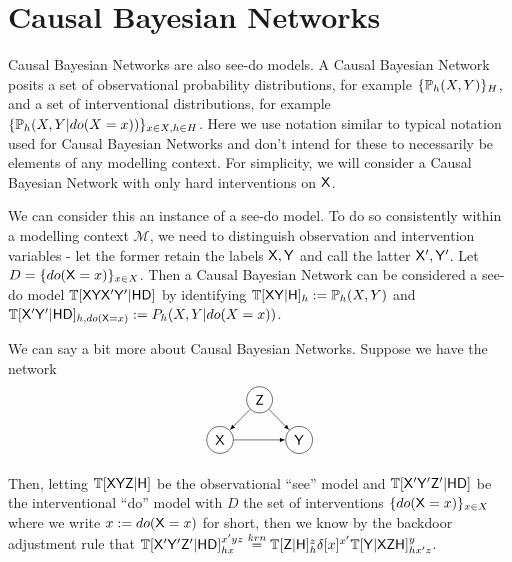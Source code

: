 

\section{Causal Bayesian Networks}

Causal Bayesian Networks are also see-do models. A Causal Bayesian Network posits a set of observational probability distributions, for example $\{\mathbb{P}_h(X,Y)\}_H$, and a set of interventional distributions, for example $\{\mathbb{P}_h(X,Y|do(X=x))\}_{x\in X,h\in H}$. Here we use notation similar to typical notation used for Causal Bayesian Networks and don't intend for these to necessarily be elements of any modelling context. For simplicity, we will consider a Causal Bayesian Network with only hard interventions on $\mathsf{X}$. 

We can consider this an instance of a see-do model. To do so consistently within a modelling context $\mathscr{M}$, we need to distinguish observation and intervention variables - let the former retain the labels $\mathsf{X},\mathsf{Y}$ and call the latter $\mathsf{X}',\mathsf{Y}'$. Let $D=\{do(\mathsf{X}=x)\}_{x\in X}$. Then a Causal Bayesian Network can be considered a see-do model $\mathbb{T}[\mathsf{XYX'Y'}|\mathsf{HD}]$ by identifying $\mathbb{T}[\mathsf{XY}|\mathsf{H}]_h := \mathbb{P}_h(X,Y)$ and $\mathbb{T}[\mathsf{X'Y'}|\mathsf{HD}]_{h,do(\mathsf{X}=x)}:={P}_h(X,Y|do(X=x))$.


We can say a bit more about Causal Bayesian Networks. Suppose we have the network
\begin{align*}
\begin{tikzpicture}
    \path (0,0) node[draw,circle] (X) {$\RV{X}$}
    ++ (1,1) node[draw,circle] (Z) {$\RV{Z}$}
    ++ (1,-1) node[draw, circle] (Y) {$\RV{Y}$};
    \draw[-latex] (X)--(Y);
    \draw[-latex] (Z) -- (Y);
    \draw[-latex] (Z) -- (X);
\end{tikzpicture}
\end{align*}

Then, letting $\mathbb{T}[\mathsf{XYZ}|\mathsf{H}]$ be the observational ``see'' model and $\mathbb{T}[\mathsf{X'Y'Z'}|\mathsf{HD}]$ be the interventional ``do'' model with $D$ the set of interventions $\{do(\mathsf{X}=x)\}_{x\in X}$ where we write $x:=do(\mathsf{X}=x)$ for short, then we know by the backdoor adjustment rule that $\mathbb{T}[\mathsf{X'Y'Z'}|\mathsf{HD}]_{hx}^{x'yz} \overset{krn}{=} \mathbb{T}[\mathsf{Z}|\mathsf{H}]_h^z \delta[x]^{x'} \mathbb{T}[\mathsf{Y}|\mathsf{XZH}]_{hx'z}^y$. 

